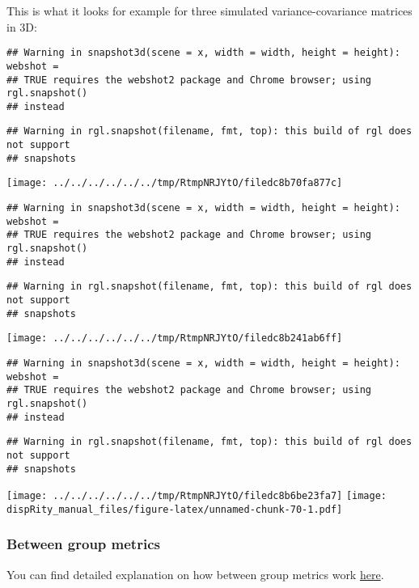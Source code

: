 \documentclass[
]{book}
\begin{document}
This is what it looks for example for three simulated variance-covariance matrices in 3D:

\begin{verbatim}
## Warning in snapshot3d(scene = x, width = width, height = height): webshot =
## TRUE requires the webshot2 package and Chrome browser; using rgl.snapshot()
## instead
\end{verbatim}

\begin{verbatim}
## Warning in rgl.snapshot(filename, fmt, top): this build of rgl does not support
## snapshots
\end{verbatim}

\texttt{[image: ../../../../../../tmp/RtmpNRJYtO/filedc8b70fa877c]}

\begin{verbatim}
## Warning in snapshot3d(scene = x, width = width, height = height): webshot =
## TRUE requires the webshot2 package and Chrome browser; using rgl.snapshot()
## instead
\end{verbatim}

\begin{verbatim}
## Warning in rgl.snapshot(filename, fmt, top): this build of rgl does not support
## snapshots
\end{verbatim}

\texttt{[image: ../../../../../../tmp/RtmpNRJYtO/filedc8b241ab6ff]}

\begin{verbatim}
## Warning in snapshot3d(scene = x, width = width, height = height): webshot =
## TRUE requires the webshot2 package and Chrome browser; using rgl.snapshot()
## instead
\end{verbatim}

\begin{verbatim}
## Warning in rgl.snapshot(filename, fmt, top): this build of rgl does not support
## snapshots
\end{verbatim}

\texttt{[image: ../../../../../../tmp/RtmpNRJYtO/filedc8b6be23fa7]}
\texttt{[image: dispRity\_manual\_files/figure-latex/unnamed-chunk-70-1.pdf]}

\hypertarget{betweengroupmetricslist}{%
\subsubsection{Between group metrics}\label{betweengroupmetricslist}}

You can find detailed explanation on how between group metrics work \protect\hyperlink{betweengroupmetricsexplain}{here}.
\end{document}
